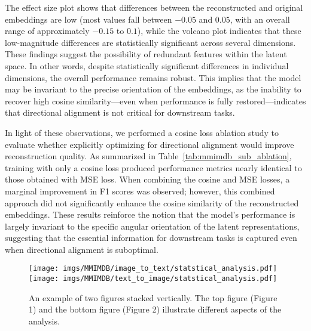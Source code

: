 The effect size plot shows that differences between the reconstructed and original embeddings are low (most values fall between $-0.05$ and $0.05$, with an overall range of approximately $-0.15$ to $0.1$), while the volcano plot indicates that these low-magnitude differences are statistically significant across several dimensions. These findings suggest the possibility of redundant features within the latent space. In other words, despite statistically significant differences in individual dimensions, the overall performance remains robust. This implies that the model may be invariant to the precise orientation of the embeddings, as the inability to recover high cosine similarity—even when performance is fully restored—indicates that directional alignment is not critical for downstream tasks.

In light of these observations, we performed a cosine loss ablation study to evaluate whether explicitly optimizing for directional alignment would improve reconstruction quality. As summarized in Table~\ref{tab:mmimdb_sub_ablation}, training with only a cosine loss produced performance metrics nearly identical to those obtained with MSE loss. When combining the cosine and MSE losses, a marginal improvement in F1 scores was observed; however, this combined approach did not significantly enhance the cosine similarity of the reconstructed embeddings. These results reinforce the notion that the model’s performance is largely invariant to the specific angular orientation of the latent representations, suggesting that the essential information for downstream tasks is captured even when directional alignment is suboptimal.

\begin{figure}[ht!]
    \centering
    \texttt{[image: imgs/MMIMDB/image\_to\_text/statstical\_analysis.pdf]}
    \texttt{[image: imgs/MMIMDB/text\_to\_image/statstical\_analysis.pdf]}
    \caption{An example of two figures stacked vertically. The top figure (Figure 1) and the bottom figure (Figure 2) illustrate different aspects of the analysis.}
    \label{fig:mmimdb_stats}
\end{figure}

